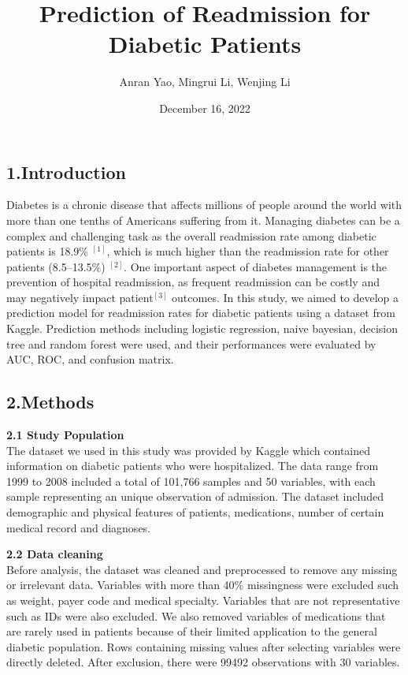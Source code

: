 \documentclass[
]{article}
\title{Prediction of Readmission for Diabetic Patients}
\author{Anran Yao, Mingrui Li, Wenjing Li}
\date{December 16, 2022}
\begin{document}
\maketitle

\hypertarget{introduction}{%
\subsection{1.Introduction}\label{introduction}}

Diabetes is a chronic disease that affects millions of people around the
world with more than one tenths of Americans suffering from it. Managing
diabetes can be a complex and challenging task as the overall
readmission rate among diabetic patients is 18.9\% \(^{[1]}\), which is
much higher than the readmission rate for other patients (8.5--13.5\%)
\(^{[2]}\). One important aspect of diabetes management is the
prevention of hospital readmission, as frequent readmission can be
costly and may negatively impact patient\(^{[3]}\) outcomes. In this
study, we aimed to develop a prediction model for readmission rates for
diabetic patients using a dataset from Kaggle. Prediction methods
including logistic regression, naive bayesian, decision tree and random
forest were used, and their performances were evaluated by AUC, ROC, and
confusion matrix.

\hypertarget{methods}{%
\subsection{2.Methods}\label{methods}}

\textbf{2.1 Study Population }\\
The dataset we used in this study was provided by Kaggle which contained
information on diabetic patients who were hospitalized. The data range
from 1999 to 2008 included a total of 101,766 samples and 50 variables,
with each sample representing an unique observation of admission. The
dataset included demographic and physical features of patients,
medications, number of certain medical record and diagnoses.

\textbf{2.2 Data cleaning}\\
Before analysis, the dataset was cleaned and preprocessed to remove any
missing or irrelevant data. Variables with more than 40\% missingness
were excluded such as weight, payer code and medical specialty.
Variables that are not representative such as IDs were also excluded. We
also removed variables of medications that are rarely used in patients
because of their limited application to the general diabetic population.
Rows containing missing values after selecting variables were directly
deleted. After exclusion, there were 99492 observations with 30
variables.
\end{document}
